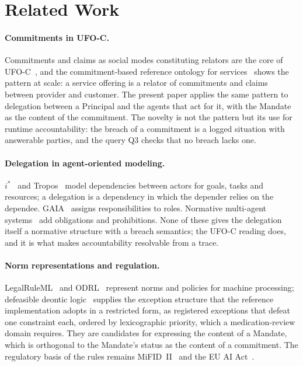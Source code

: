 \documentclass[runningheads]{llncs}
\begin{document}
\section{Related Work}
\label{sec:related}
\paragraph{Commitments in UFO-C.}
Commitments and claims as social modes constituting relators are the core of UFO-C~\cite{guizzardi2008ufoc}, and the commitment-based reference ontology for services~\cite{nardi2015commitment} shows the pattern at scale: a service offering is a relator of commitments and claims between provider and customer. The present paper applies the same pattern to delegation between a Principal and the agents that act for it, with the Mandate as the content of the commitment. The novelty is not the pattern but its use for runtime accountability: the breach of a commitment is a logged situation with answerable parties, and the query Q3 checks that no breach lacks one.

\paragraph{Delegation in agent-oriented modeling.}
$i^*$~\cite{yu2011social} and Tropos~\cite{bresciani2004tropos} model dependencies between actors for goals, tasks and resources; a delegation is a dependency in which the depender relies on the dependee. GAIA~\cite{wooldridge2000gaia} assigns responsibilities to roles. Normative multi-agent systems~\cite{boella2006introduction,dignum1999autonomous} add obligations and prohibitions. None of these gives the delegation itself a normative structure with a breach semantics; the UFO-C reading does, and it is what makes accountability resolvable from a trace.

\paragraph{Norm representations and regulation.}
LegalRuleML~\cite{athan2013legalruleml} and ODRL~\cite{odrl2018} represent norms and policies for machine processing; defeasible deontic logic~\cite{governatori2007characterising} supplies the exception structure that the reference implementation adopts in a restricted form, as registered exceptions that defeat one constraint each, ordered by lexicographic priority, which a medication-review domain requires. They are candidates for expressing the content of a Mandate, which is orthogonal to the Mandate's status as the content of a commitment. The regulatory basis of the rules remains MiFID~II~\cite{mifid2014} and the EU AI Act~\cite{euaiact2024}.
\end{document}
